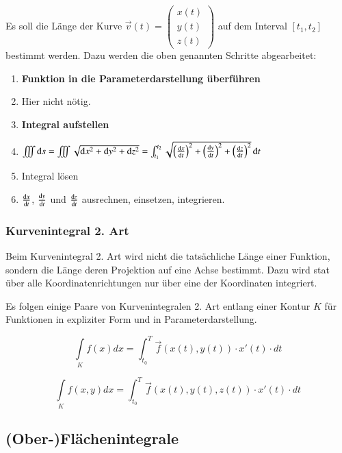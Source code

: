 Es soll die Länge der Kurve $\vec{v}(t) = \begin{pmatrix}x(t)\\y(t)\\z(t)\end{pmatrix}$ auf dem Interval $[t_1, t_2]$ bestimmt werden.
Dazu werden die oben genannten Schritte abgearbeitet:
\begin{enumerate}
    \item \textbf{Funktion in die Parameterdarstellung überführen}
    \item[] Hier nicht nötig. %
    \item \textbf{Integral aufstellen} 
    \item[] $ \iiint \diff s = \iiint \sqrt{\diff x^2 + \diff y^2 + \diff z^2} = \int_{t_1}^{t_2} \sqrt{\left(\frac{\diff x}{\diff t}\right)^2 + \left(\frac{\diff y}{\diff t}\right)^2 + \left(\frac{\diff z}{\diff t}\right)^2} \diff t$
    \item Integral lösen
    \item[] $\frac{\mathop{} \! \mathrm{d} x}{\mathop{} \! \mathrm{d} t}$, $\frac{\mathop{} \! \mathrm{d} y}{\mathop{} \! \mathrm{d} t}$ und $\frac{\mathop{} \! \mathrm{d} z}{\mathop{} \! \mathrm{d} t}$ ausrechnen, einsetzen, integrieren.
\end{enumerate}

\subsubsection{Kurvenintegral 2. Art}
Beim Kurvenintegral 2. Art wird nicht die tatsächliche Länge einer Funktion, sondern die Länge deren Projektion auf eine Achse bestimmt.
Dazu wird stat über alle Koordinatenrichtungen nur über eine der Koordinaten integriert.

Es folgen einige Paare von Kurvenintegralen 2. Art entlang einer Kontur $K$ für Funktionen in expliziter Form und in Parameterdarstellung.

\[
    \int\limits_{K}f(x)dx = \int_{t_0}^{T}\vec{f}(x(t), y(t)) \cdot x'(t) \cdot dt
\]

\[
    \int\limits_{K}f(x, y)dx = \int_{t_0}^{T}\vec{f}(x(t), y(t), z(t)) \cdot x'(t) \cdot dt
\]


\subsection{(Ober-)Flächenintegrale}
